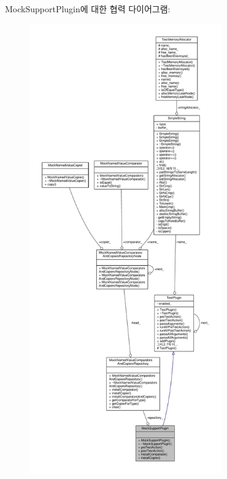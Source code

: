 Mock\+Support\+Plugin에 대한 협력 다이어그램\+:
\nopagebreak
\begin{figure}[H]
\begin{center}
\leavevmode
\includegraphics[height=550pt]{class_mock_support_plugin__coll__graph}
\end{center}
\end{figure}
